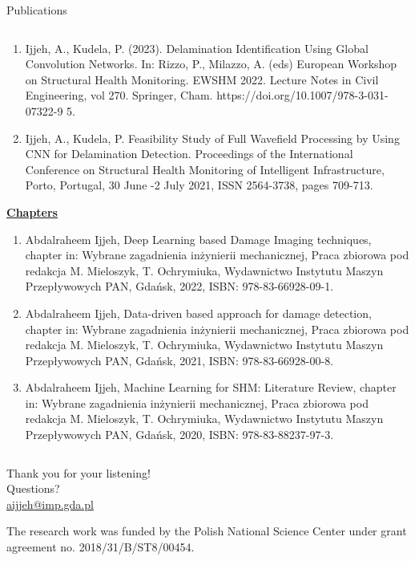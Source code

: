 \documentclass[10pt,aspectratio=169,dvipsnames]{beamer} %
\begin{document}
\begin{frame}{Publications}
\begin{tiny}
\begin{columns}[T]
\begin{column}[t]{0.48\textwidth}
\begin{enumerate}
						\item {Ijjeh, A.}, Kudela, P. (2023). Delamination Identification Using Global Convolution Networks. In: Rizzo,
						P., Milazzo, A. (eds) European Workshop on Structural Health Monitoring. EWSHM 2022. Lecture Notes
						in Civil Engineering, vol 270. Springer, Cham. https://doi.org/10.1007/978-3-031-07322-9 5.		
						\item {Ijjeh, A.}, Kudela, P. Feasibility Study of Full Wavefield Processing by Using CNN for Delamination
						Detection. 
						Proceedings of the International Conference on Structural Health Monitoring of Intelligent
						Infrastructure, Porto, Portugal, 30 June -2 July 2021, ISSN 2564-3738, pages 709-713.
					\end{enumerate}		
					\underline{\textbf{Chapters}}					
					\begin{enumerate}
						\justifying
						\item {Abdalraheem Ijjeh}, Deep Learning based Damage Imaging techniques, chapter in: Wybrane zagadnienia
						inżynierii mechanicznej, Praca zbiorowa pod redakcja M. Mieloszyk, T. Ochrymiuka, Wydawnictwo Instytutu
						Maszyn Przepływowych PAN, Gdańsk, 2022, ISBN: 978-83-66928-09-1.
						\item {Abdalraheem Ijjeh}, Data-driven based approach for damage detection, chapter in: Wybrane zagadnienia
						inżynierii mechanicznej, Praca zbiorowa pod redakcja M. Mieloszyk, T. Ochrymiuka, Wydawnictwo Instytutu
						Maszyn Przepływowych PAN, Gdańsk, 2021, ISBN: 978-83-66928-00-8.				
						\item {Abdalraheem Ijjeh}, Machine Learning for SHM: Literature Review, chapter in: Wybrane zagadnienia
						inżynierii mechanicznej, Praca zbiorowa pod redakcja M. Mieloszyk, T. Ochrymiuka, Wydawnictwo Instytutu
						Maszyn Przepływowych PAN, Gdańsk, 2020, ISBN: 978-83-88237-97-3.
					\end{enumerate}
				\end{column}		
			\end{columns}
		\end{tiny}
	\end{frame}	
	\setcounter{subfigure}{0}
	{
		\begin{frame}[standout]
			Thank you for your listening!\\ \vspace{12pt}
			Questions?\\ \vspace{12pt}
			\url{aijjeh@imp.gda.pl}
			\par\medskip
			\par\medskip
			\footnotesize
			The research work was funded by the Polish National Science Center under grant agreement no. 2018/31/B/ST8/00454.
		\end{frame}
	}
	
\end{document}

